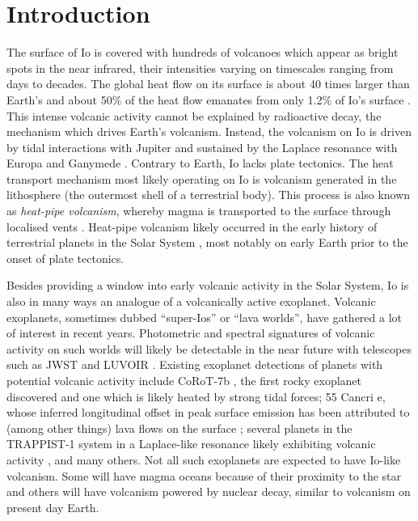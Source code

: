 \documentclass[modern]{aastex62}
\begin{document}
\section{Introduction}
The surface of Io is covered with hundreds of volcanoes which appear as bright spots in the near infrared, their intensities varying on timescales ranging from days to decades.
The global heat flow on its surface is about 40 times larger than Earth's \citep{breuer2007,davies2010} and about 50\% of the heat flow emanates from only 1.2\% of Io's surface \citep{veeder2012}.
This intense volcanic activity cannot be explained by radioactive decay, the mechanism which drives Earth's volcanism.
Instead, the volcanism on Io is driven by tidal interactions with Jupiter and sustained by the Laplace resonance with Europa and Ganymede \citep{peale1979}.
Contrary to Earth, Io lacks plate tectonics.
The heat transport mechanism most likely operating on Io is volcanism generated in the lithosphere (the outermost shell of a terrestrial body).
This process is also known as \emph{heat-pipe volcanism}, whereby magma is transported to the surface through localised vents \citep{oreilly1981}.
Heat-pipe volcanism likely occurred in the early history of terrestrial planets in the Solar System \citep{moore2013,moore2017}, most notably on early Earth prior to the onset of plate tectonics.

Besides providing a window into early volcanic activity in the Solar System, Io is also in many ways an analogue of a volcanically active exoplanet.
Volcanic exoplanets, sometimes dubbed ``super-Ios'' or ``lava worlds'', have gathered a lot of interest in recent years.
Photometric and spectral signatures of volcanic activity on such worlds will likely be detectable in the near future with telescopes such as JWST and LUVOIR \citep{kaltenegger2010,henning2018,oza2019,chao2020}.
Existing exoplanet detections of planets with potential volcanic activity include CoRoT-7b \citep{barnes2010}, the first rocky exoplanet discovered and one which is likely heated by strong tidal forces; 55 Cancri e, whose inferred longitudinal offset in peak surface emission has been attributed to (among other things) lava flows on the surface \citep{demory2016,demory2016d,hammond2017a}; several planets in the TRAPPIST-1 system in a Laplace-like resonance likely exhibiting volcanic activity \citep{kislyakova2017,dobos2019}, and many others.
Not all such exoplanets are expected to have Io-like volcanism.
Some will have magma oceans because of their proximity to the star and others will have volcanism powered by nuclear decay, similar to volcanism on present day Earth.
\end{document}
